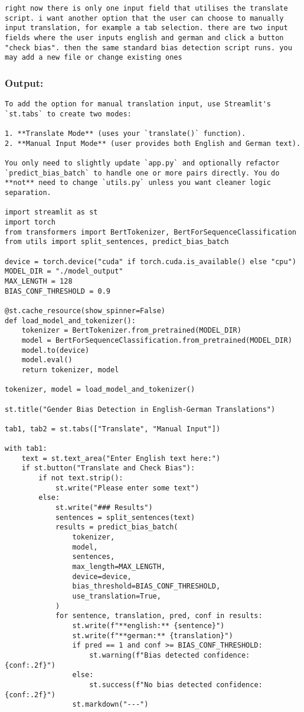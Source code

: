 \begin{appendices}
\begin{lstlisting}
right now there is only one input field that utilises the translate script. i want another option that the user can choose to manually input translation, for example a tab selection. there are two input fields where the user inputs english and german and click a button "check bias". then the same standard bias detection script runs. you may add a new file or change existing ones
\end{lstlisting}

\subsubsection{Output:}
\begin{lstlisting}
To add the option for manual translation input, use Streamlit's `st.tabs` to create two modes:

1. **Translate Mode** (uses your `translate()` function).
2. **Manual Input Mode** (user provides both English and German text).

You only need to slightly update `app.py` and optionally refactor `predict_bias_batch` to handle one or more pairs directly. You do **not** need to change `utils.py` unless you want cleaner logic separation.

import streamlit as st
import torch
from transformers import BertTokenizer, BertForSequenceClassification
from utils import split_sentences, predict_bias_batch

device = torch.device("cuda" if torch.cuda.is_available() else "cpu")
MODEL_DIR = "./model_output"
MAX_LENGTH = 128
BIAS_CONF_THRESHOLD = 0.9

@st.cache_resource(show_spinner=False)
def load_model_and_tokenizer():
    tokenizer = BertTokenizer.from_pretrained(MODEL_DIR)
    model = BertForSequenceClassification.from_pretrained(MODEL_DIR)
    model.to(device)
    model.eval()
    return tokenizer, model

tokenizer, model = load_model_and_tokenizer()

st.title("Gender Bias Detection in English-German Translations")

tab1, tab2 = st.tabs(["Translate", "Manual Input"])

with tab1:
    text = st.text_area("Enter English text here:")
    if st.button("Translate and Check Bias"):
        if not text.strip():
            st.write("Please enter some text")
        else:
            st.write("### Results")
            sentences = split_sentences(text)
            results = predict_bias_batch(
                tokenizer,
                model,
                sentences,
                max_length=MAX_LENGTH,
                device=device,
                bias_threshold=BIAS_CONF_THRESHOLD,
                use_translation=True,
            )
            for sentence, translation, pred, conf in results:
                st.write(f"**english:** {sentence}")
                st.write(f"**german:** {translation}")
                if pred == 1 and conf >= BIAS_CONF_THRESHOLD:
                    st.warning(f"Bias detected confidence: {conf:.2f}")
                else:
                    st.success(f"No bias detected confidence: {conf:.2f}")
                st.markdown("---")


\end{lstlisting}
\end{appendices}
